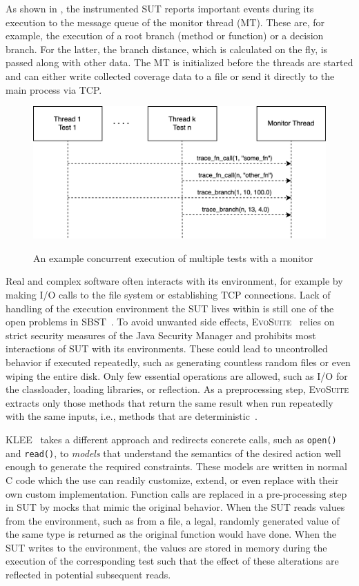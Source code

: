 \documentclass[paper=a4,%
  twoside,%
  BCOR4mm,%
  abstract=true,%
  toc=bibliography,%
  chapterprefix=true,%
  toc=bibliographynumbered,%
  open=right,%
  english,%
  pagesize=pdftex]{scrreprt}
\begin{document}
As shown in , the instrumented \ac{SUT} reports important events during its execution to the message queue of the monitor thread (MT). These are, for example, the execution of a root branch (method or function) or a decision branch. For the latter, the branch distance, which is calculated on the fly, is passed along with other data. The MT is initialized before the threads are started and can either write collected coverage data to a file or send it directly to the main process via \ac{TCP}.

\begin{figure}[h]
\caption{An example concurrent execution of multiple tests with a monitor}
\centering
\includegraphics[width=\textwidth]{test-execution}
\label{fig:test-execution}
\end{figure}

Real and complex software often interacts with its environment, for example by making I/O calls to the file system or establishing \ac{TCP} connections. Lack of handling of the execution environment the \ac{SUT} lives within is still one of the open problems in \ac{SBST}~\cite{McMinn2011}. To avoid unwanted side effects, \textsc{EvoSuite}~\cite{Fraser2013a} relies on strict security measures of the Java Security Manager and prohibits most interactions of \ac{SUT} with its environments. These could lead to uncontrolled behavior if executed repeatedly, such as generating countless random files or even wiping the entire disk. Only few essential operations are allowed, such as I/O for the classloader, loading libraries, or reflection. As a preprocessing step, \textsc{EvoSuite} extracts only those methods that return the same result when run repeatedly with the same inputs, i.e., methods that are deterministic~\cite{Fraser2012}.

\textsc{KLEE}~\cite{cadar2008klee} takes a different approach and redirects concrete calls, such as \texttt{open()} and \texttt{read()}, to \textit{models} that understand the semantics of the desired action well enough to generate the required constraints. These models are written in normal C code which the use can readily customize, extend, or even replace with their own custom implementation. Function calls are replaced in a pre-processing step in \ac{SUT} by mocks that mimic the original behavior. When the \ac{SUT} reads values from the environment, such as from a file, a legal, randomly generated value of the same type is returned as the original function would have done. When the \ac{SUT} writes to the environment, the values are stored in memory during the execution of the corresponding test such that the effect of these alterations are reflected in potential subsequent reads.
\end{document}
